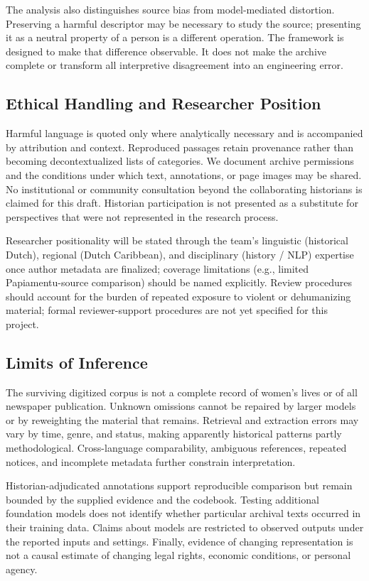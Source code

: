 \documentclass[sigconf]{acmart}
\begin{document}
The analysis also distinguishes source bias from model-mediated distortion. Preserving a harmful descriptor may be necessary to study the source; presenting it as a neutral property of a person is a different operation. The framework is designed to make that difference observable. It does not make the archive complete or transform all interpretive disagreement into an engineering error.

\subsection{Ethical Handling and Researcher Position}

Harmful language is quoted only where analytically necessary and is accompanied by attribution and context. Reproduced passages retain provenance rather than becoming decontextualized lists of categories. We document archive permissions and the conditions under which text, annotations, or page images may be shared. No institutional or community consultation beyond the collaborating historians is claimed for this draft. Historian participation is not presented as a substitute for perspectives that were not represented in the research process.

Researcher positionality will be stated through the team's linguistic (historical Dutch), regional (Dutch Caribbean), and disciplinary (history / NLP) expertise once author metadata are finalized; coverage limitations (e.g., limited Papiamentu-source comparison) should be named explicitly. Review procedures should account for the burden of repeated exposure to violent or dehumanizing material; formal reviewer-support procedures are not yet specified for this project.

\subsection{Limits of Inference}

The surviving digitized corpus is not a complete record of women's lives or of all newspaper publication. Unknown omissions cannot be repaired by larger models or by reweighting the material that remains. Retrieval and extraction errors may vary by time, genre, and status, making apparently historical patterns partly methodological. Cross-language comparability, ambiguous references, repeated notices, and incomplete metadata further constrain interpretation.

Historian-adjudicated annotations support reproducible comparison but remain bounded by the supplied evidence and the codebook. Testing additional foundation models does not identify whether particular archival texts occurred in their training data. Claims about models are restricted to observed outputs under the reported inputs and settings. Finally, evidence of changing representation is not a causal estimate of changing legal rights, economic conditions, or personal agency.
\end{document}

